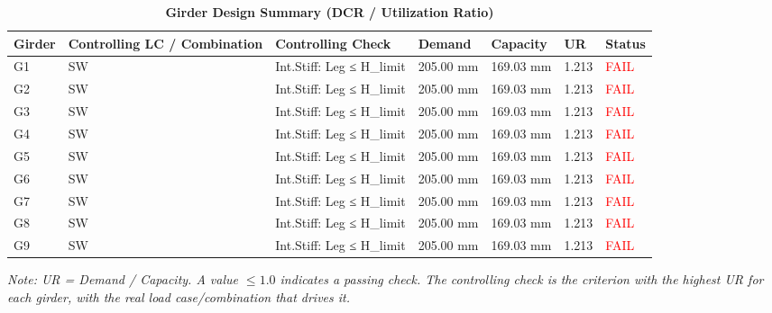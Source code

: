 \documentclass[12pt,a4paper]{report}
\numberwithin{table}{chapter}
\numberwithin{figure}{chapter}
\begin{document}
\vspace{1em}
\vspace{0.4em}
\begin{longtable}{|C{1.6cm}|>{\centering\arraybackslash}p{3.6cm}|C{2.4cm}|C{2.0cm}|C{2.1cm}|C{1.7cm}|C{1.5cm}|}
\caption{\textbf{Girder Design Summary (DCR / Utilization Ratio)}}
\hline
\textbf{Girder} & \textbf{Controlling LC / Combination} & \textbf{Controlling Check} & \textbf{Demand} & \textbf{Capacity} & \textbf{UR} & \textbf{Status} \\[6pt]
\hline
G1 & SW & Int.Stiff:\allowbreak{} Leg ≤ H\_\allowbreak{}limit & 205.00 mm & 169.03 mm & 1.213 & \textcolor{red}{FAIL} \\[6pt]
\hline
G2 & SW & Int.Stiff:\allowbreak{} Leg ≤ H\_\allowbreak{}limit & 205.00 mm & 169.03 mm & 1.213 & \textcolor{red}{FAIL} \\[6pt]
\hline
G3 & SW & Int.Stiff:\allowbreak{} Leg ≤ H\_\allowbreak{}limit & 205.00 mm & 169.03 mm & 1.213 & \textcolor{red}{FAIL} \\[6pt]
\hline
G4 & SW & Int.Stiff:\allowbreak{} Leg ≤ H\_\allowbreak{}limit & 205.00 mm & 169.03 mm & 1.213 & \textcolor{red}{FAIL} \\[6pt]
\hline
G5 & SW & Int.Stiff:\allowbreak{} Leg ≤ H\_\allowbreak{}limit & 205.00 mm & 169.03 mm & 1.213 & \textcolor{red}{FAIL} \\[6pt]
\hline
G6 & SW & Int.Stiff:\allowbreak{} Leg ≤ H\_\allowbreak{}limit & 205.00 mm & 169.03 mm & 1.213 & \textcolor{red}{FAIL} \\[6pt]
\hline
G7 & SW & Int.Stiff:\allowbreak{} Leg ≤ H\_\allowbreak{}limit & 205.00 mm & 169.03 mm & 1.213 & \textcolor{red}{FAIL} \\[6pt]
\hline
G8 & SW & Int.Stiff:\allowbreak{} Leg ≤ H\_\allowbreak{}limit & 205.00 mm & 169.03 mm & 1.213 & \textcolor{red}{FAIL} \\[6pt]
\hline
G9 & SW & Int.Stiff:\allowbreak{} Leg ≤ H\_\allowbreak{}limit & 205.00 mm & 169.03 mm & 1.213 & \textcolor{red}{FAIL} \\[6pt]
\hline
\end{longtable}
\noindent\textit{Note: UR = Demand / Capacity. A value $\leq 1.0$ indicates a passing check. The controlling check is the criterion with the highest UR for each girder, with the real load case/combination that drives it.}

\vspace{1em}
\end{document}
